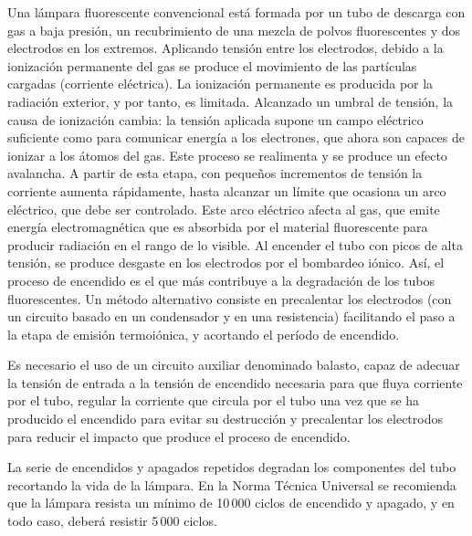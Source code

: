 Una lámpara fluorescente convencional está formada por un tubo de
descarga con gas a baja presión, un recubrimiento de una mezcla de
polvos fluorescentes y dos electrodos en los extremos. Aplicando tensión
entre los electrodos, debido a la ionización permanente del gas se
produce el movimiento de las partículas cargadas (corriente eléctrica).
La ionización permanente es producida por la radiación exterior, y
por tanto, es limitada. Alcanzado un umbral de tensión, la causa de
ionización cambia: la tensión aplicada supone un campo eléctrico suficiente
como para comunicar energía a los electrones, que ahora son capaces
de ionizar a los átomos del gas. Este proceso se realimenta y se produce
un efecto avalancha. A partir de esta etapa, con pequeños incrementos
de tensión la corriente aumenta rápidamente, hasta alcanzar un límite
que ocasiona un arco eléctrico, que debe ser controlado. Este arco
eléctrico afecta al gas, que emite energía electromagnética que es
absorbida por el material fluorescente para producir radiación en
el rango de lo visible. Al encender el tubo con picos de alta tensión,
se produce desgaste en los electrodos por el bombardeo iónico. Así,
el proceso de encendido es el que más contribuye a la degradación
de los tubos fluorescentes. Un método alternativo consiste en precalentar
los electrodos (con un circuito basado en un condensador y en una
resistencia) facilitando el paso a la etapa de emisión termoiónica,
y acortando el período de encendido. 

Es necesario el uso de un circuito auxiliar denominado balasto, capaz
de adecuar la tensión de entrada a la tensión de encendido necesaria
para que fluya corriente por el tubo, regular la corriente que circula
por el tubo una vez que se ha producido el encendido para evitar su
destrucción y precalentar los electrodos para reducir el impacto que
produce el proceso de encendido. 

La serie de encendidos y apagados repetidos degradan los componentes
del tubo recortando la vida de la lámpara. En la Norma Técnica Universal
\citep{Egido.Lorenzo1998} se recomienda que la lámpara resista un
mínimo de 10\,000 ciclos de encendido y apagado, y en todo caso,
deberá resistir 5\,000 ciclos. 


